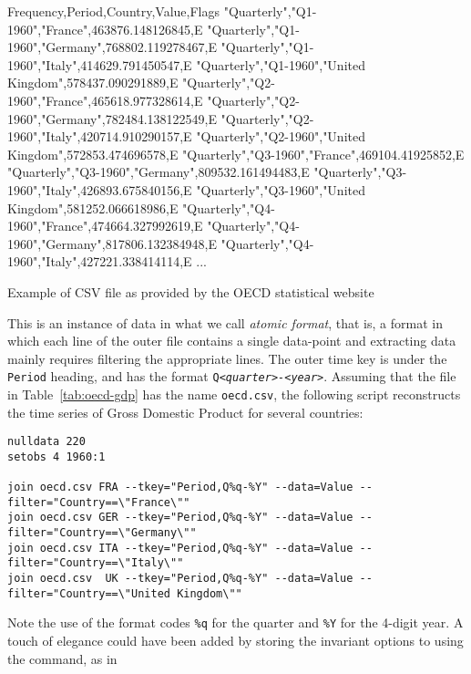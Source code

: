 \begin{table}[htbp]
\begin{code}
Frequency,Period,Country,Value,Flags
"Quarterly","Q1-1960","France",463876.148126845,E
"Quarterly","Q1-1960","Germany",768802.119278467,E
"Quarterly","Q1-1960","Italy",414629.791450547,E
"Quarterly","Q1-1960","United Kingdom",578437.090291889,E
"Quarterly","Q2-1960","France",465618.977328614,E
"Quarterly","Q2-1960","Germany",782484.138122549,E
"Quarterly","Q2-1960","Italy",420714.910290157,E
"Quarterly","Q2-1960","United Kingdom",572853.474696578,E
"Quarterly","Q3-1960","France",469104.41925852,E
"Quarterly","Q3-1960","Germany",809532.161494483,E
"Quarterly","Q3-1960","Italy",426893.675840156,E
"Quarterly","Q3-1960","United Kingdom",581252.066618986,E
"Quarterly","Q4-1960","France",474664.327992619,E
"Quarterly","Q4-1960","Germany",817806.132384948,E
"Quarterly","Q4-1960","Italy",427221.338414114,E
...
\end{code}
\caption{Example of CSV file as provided by the OECD statistical
  website}
\label{tab:oecd-gdp}  
\end{table}

This is an instance of data in what we call \emph{atomic format}, that
is, a format in which each line of the outer file contains a single
data-point and extracting data mainly requires filtering the appropriate
lines. The outer time key is under the \texttt{Period} heading, and
has the format \texttt{Q\emph{<quarter>-<year>}}. Assuming that the
file in Table~\ref{tab:oecd-gdp} has the name \texttt{oecd.csv}, the
following script reconstructs the time series of Gross Domestic
Product for several countries:

\begin{footnotesize}
\begin{verbatim}
nulldata 220
setobs 4 1960:1

join oecd.csv FRA --tkey="Period,Q%q-%Y" --data=Value --filter="Country==\"France\""
join oecd.csv GER --tkey="Period,Q%q-%Y" --data=Value --filter="Country==\"Germany\""
join oecd.csv ITA --tkey="Period,Q%q-%Y" --data=Value --filter="Country==\"Italy\""
join oecd.csv  UK --tkey="Period,Q%q-%Y" --data=Value --filter="Country==\"United Kingdom\""
\end{verbatim}
\end{footnotesize}

Note the use of the format codes \verb|%q| for the quarter and
\verb|%Y| for the 4-digit year. A touch of elegance could
have been added by storing the invariant options to  using
the  command, as in


